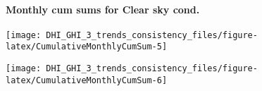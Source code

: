 \documentclass[
  10pt,
  a4paper,oneside]{article}
\begin{document}
\hypertarget{monthly-cum-sums-for-clear-sky-cond.}{%
\paragraph{Monthly cum sums for Clear sky cond.}\label{monthly-cum-sums-for-clear-sky-cond.}}

\begin{center}\texttt{[image: DHI\_GHI\_3\_trends\_consistency\_files/figure-latex/CumulativeMonthlyCumSum-5]} \end{center}

\begin{center}\texttt{[image: DHI\_GHI\_3\_trends\_consistency\_files/figure-latex/CumulativeMonthlyCumSum-6]} \end{center}

\newpage

\footnotesize
\end{document}
